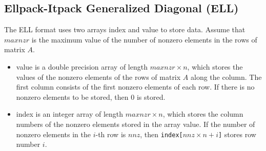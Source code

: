 \documentclass[a4paper]{article}
\begin{document}
\newpage
\subsection{Ellpack-Itpack Generalized Diagonal (ELL)}
The ELL format uses two arrays {\ttfamily index} and {\ttfamily value} to store
data. Assume that $maxnzr$ is the maximum value of the number of nonzero elements in the rows of matrix $A$.
\begin{itemize}
\item {\ttfamily value} is a double precision array of length 
      $maxnzr \times n$, which stores the values of the nonzero elements of the rows
      of matrix $A$ along the column. The first column consists of
      the first nonzero elements of each row. If there is no nonzero elements to be stored, then $0$ is stored.
\item {\ttfamily index} is an integer array of length $maxnzr
      \times n$, which stores the column numbers of the nonzero
      elements stored in the array {\ttfamily value}. If the number of
      nonzero elements in the $i$-th row is $nnz$, then {\tt index[$nnz
      \times n + i$]} stores row number $i$.
\end{itemize}
\end{document}
